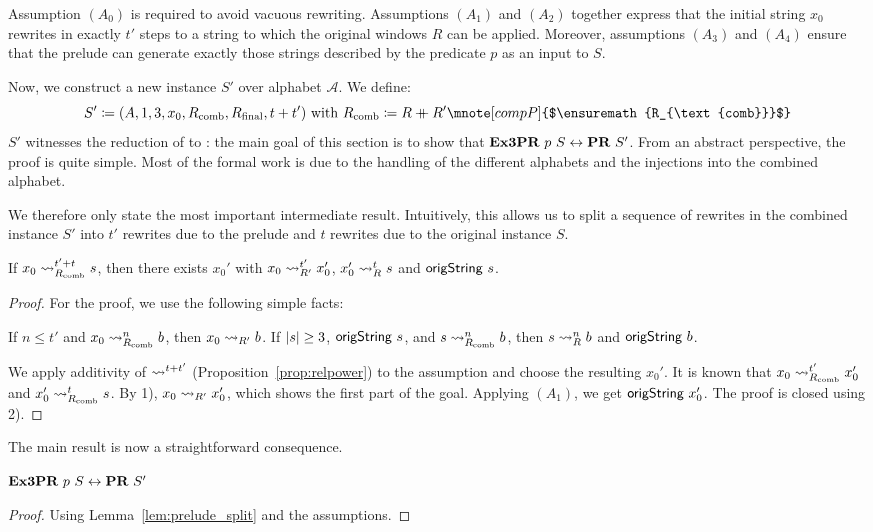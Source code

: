 Assumption $(A_0)$ is required to avoid vacuous rewriting.
Assumptions $(A_1)$ and $(A_2)$ together express that the initial string $x_0$ rewrites in exactly $t'$ steps to a string to which the original windows $R$ can be applied. Moreover, assumptions $(A_3)$ and $(A_4)$ ensure that the prelude can generate exactly those strings described by the predicate $p$ as an input to $S$.

\newcommand{\Rcomb}{\ensuremath{R_{\text{comb}}}}
Now, we construct a new \PR{} instance $S'$ over alphabet $\mathcal{A}$. We define:
\[S' \defeq (A, 1, 3, x_0, \Rcomb, \Rfinal, t + t')~\text{with}~\Rcomb \defeq R \concat R' \mnote[compP]{$\Rcomb$}\]
$S'$ witnesses the reduction of \expr{} to \PR{}: the main goal of this section is to show that 
$\textbf{Ex3PR}{}~p~S \leftrightarrow \textbf{PR}{}~S'$. From an abstract perspective, the proof is quite simple. 
Most of the formal work is due to the handling of the different alphabets and the injections into the combined alphabet.

We therefore only state the most important intermediate result. Intuitively, this allows us to split a sequence of rewrites in the combined instance $S'$ into $t'$ rewrites due to the prelude and $t$ rewrites due to the original instance $S$. 
\begin{lemma}\label{lem:prelude_split}
  If $x_0 \strent{\Rcomb}^{t' + t} s$, then there exists $x_0'$ with $x_0 \rightsquigarrow_{R'}^{t'} x_0'$, $x_0' \rightsquigarrow_{R}^t s$ and $\textsf{origString}~s$. 
\end{lemma}
\begin{proof}
  For the proof, we use the following simple facts:
  \begin{enumerate}[1)]
     If $n \le t'$ and $x_0 \strent{\Rcomb}^n b$, then $x_0 \rightsquigarrow_{R'} b$. 
     If $|s| \ge 3$, $\textsf{origString}~s$, and $s \strent{\Rcomb}^n b$, then $s \rightsquigarrow_{R}^n b$ and $\textsf{origString}~b$. 
  \end{enumerate}
  We apply additivity of $\rightsquigarrow_{}^{t+t'}$ (Proposition~\ref{prop:relpower}) to the assumption and choose the resulting $x_0'$. 
  It is known that $x_0 \strent{\Rcomb}^{t'} x_0'$ and $x_0' \strent{\Rcomb}^t s$. 
  By 1), $x_0 \rightsquigarrow_{R'} x_0'$, which shows the first part of the goal. 
  Applying $(A_1)$, we get $\textsf{origString}~x_0'$. The proof is closed using 2).
\end{proof}

The main result is now a straightforward consequence.
\begin{theorem}[][prelude_ok]\label{thm:expr_to_pr}
  $\textbf{Ex3PR}{}~p~S \leftrightarrow \textbf{PR}{}~S'$
\end{theorem}
\begin{proof}
  Using Lemma~\ref{lem:prelude_split} and the assumptions.
\end{proof}

